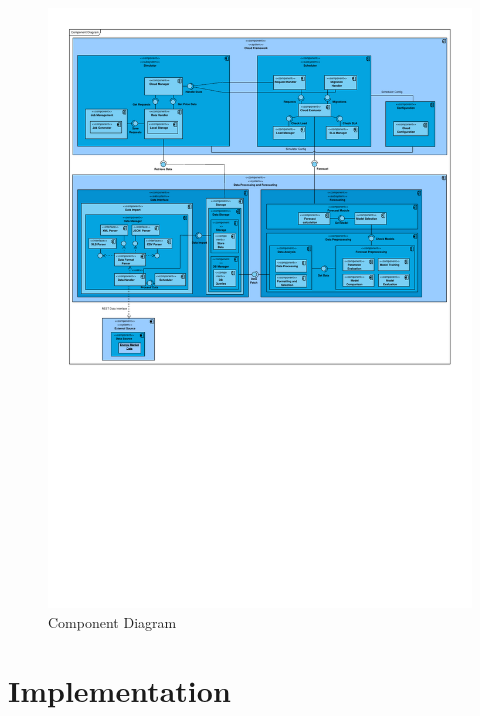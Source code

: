 \documentclass[paper=a4, fontsize=11pt]{scrartcl} %
\numberwithin{equation}{section} %
\numberwithin{figure}{section} %
\numberwithin{table}{section} %
\begin{document}
\begin{figure}[htbp]
	\hspace*{-0.4in}
		\includegraphics[angle=90,width=\paperheight,height=\paperwidth,keepaspectratio=true]{figures/Component_Diagram.pdf}
	\caption{Component Diagram}
	\label{fig:Component_Diagram}
\end{figure}


\newpage


\section{Implementation}
\end{document}

